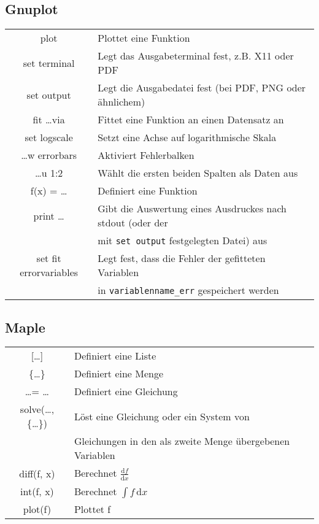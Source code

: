 \subsection{Gnuplot}
\begin{tabular}[h!]{cl}
  plot           & Plottet eine Funktion \\
  set terminal   & Legt das Ausgabeterminal fest, z.B. X11 oder PDF \\
  set output     & Legt die Ausgabedatei fest (bei PDF, PNG oder ähnlichem) \\
  fit \ldots via & Fittet eine Funktion an einen Datensatz an \\
  set logscale   & Setzt eine Achse auf logarithmische Skala \\
  \ldots w errorbars & Aktiviert Fehlerbalken \\
  \ldots u 1:2   & Wählt die ersten beiden Spalten als Daten aus \\
  f(x) = \ldots  & Definiert eine Funktion \\
  print \ldots   & Gibt die Auswertung eines Ausdruckes nach stdout (oder der \\
                 & mit \verb'set output' festgelegten Datei) aus \\
  set fit errorvariables & Legt fest, dass die Fehler der gefitteten Variablen
  \\
                 &  in \verb'variablenname_err' gespeichert werden
\end{tabular}

\subsection{Maple}
\begin{tabular}[h!]{cl}
  [\ldots]       & Definiert eine Liste \\
  \{\ldots\}     & Definiert eine Menge \\
  \ldots = \ldots & Definiert eine Gleichung \\
  solve(\ldots, \{\ldots\}) & Löst eine Gleichung oder ein System von \\
                 &  Gleichungen in den als zweite Menge übergebenen Variablen \\
                   diff(f, x)  & Berechnet $\frac{\mathrm df}{\mathrm dx}$ \\
  int(f, x)     & Berechnet $\int f \,\mathrm dx$ \\
  plot(f)       & Plottet f
\end{tabular}

